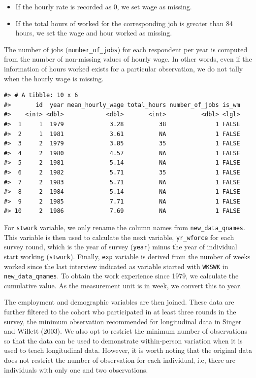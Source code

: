 \documentclass{article}
\begin{document}
\begin{itemize}
\tightlist
\item
  If the hourly rate is recorded as 0, we set wage as missing.
\item
  If the total hours of worked for the corresponding job is greater than 84 hours, we set the wage and hour worked as missing.
\end{itemize}

The number of jobs (\texttt{number\_of\_jobs}) for each respondent per year is computed from the number of non-missing values of hourly wage. In other words, even if the information of hours worked exists for a particular observation, we do not tally when the hourly wage is missing.

\begin{verbatim}
#> # A tibble: 10 x 6
#>       id  year mean_hourly_wage total_hours number_of_jobs is_wm
#>    <int> <dbl>            <dbl>       <int>          <dbl> <lgl>
#>  1     1  1979             3.28          38              1 FALSE
#>  2     1  1981             3.61          NA              1 FALSE
#>  3     2  1979             3.85          35              1 FALSE
#>  4     2  1980             4.57          NA              1 FALSE
#>  5     2  1981             5.14          NA              1 FALSE
#>  6     2  1982             5.71          35              1 FALSE
#>  7     2  1983             5.71          NA              1 FALSE
#>  8     2  1984             5.14          NA              1 FALSE
#>  9     2  1985             7.71          NA              1 FALSE
#> 10     2  1986             7.69          NA              1 FALSE
\end{verbatim}

For \texttt{stwork} variable, we only rename the column names from \texttt{new\_data\_qnames}. This variable is then used to calculate the next variable, \texttt{yr\_wforce} for each survey round, which is the year of survey (\texttt{year}) minus the year of individual start working (\texttt{stwork}). Finally, \texttt{exp} variable is derived from the number of weeks worked since the last interview indicated as variable started with \texttt{WKSWK} in \texttt{new\_data\_qnames}. To obtain the work experience since 1979, we calculate the cumulative value. As the measurement unit is in week, we convert this to year.

The employment and demographic variables are then joined. These data are further filtered to the cohort who participated in at least three rounds in the survey, the minimum observation recommended for longitudinal data in Singer and Willett (2003). We also opt to restrict the minimum number of observations so that the data can be used to demonstrate within-person variation when it is used to teach longitudinal data. However, it is worth noting that the original data does not restrict the number of observation for each individual, i.e, there are individuals with only one and two observations.
\end{document}
